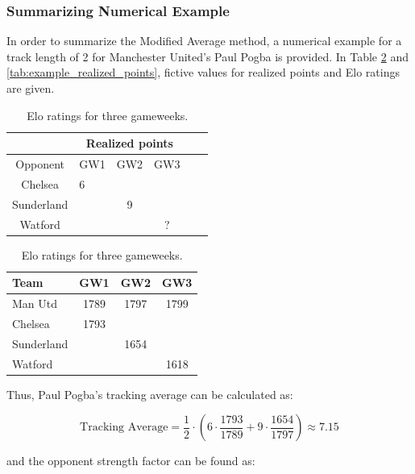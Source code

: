 \subsubsection{Summarizing Numerical Example}

In order to summarize the Modified Average method, a numerical example for a track length of 2 for Manchester United's Paul Pogba is provided. In Table \ref{tab:example_elo_ratings} and \ref{tab:example_realized_points}, fictive values for realized points and Elo ratings are given. 

\begin{table}[H]
\parbox{.45\linewidth}{
\centering
\begin{tabular}{|c|l|c|c|c|c|}
\hline
\multicolumn{1}{|c|}{} & \multicolumn{3}{c|}{Realized points} \\ \hline
Opponent            & GW1        & GW2       & GW3       \\
\hline                 
Chelsea             & 6         &           &           \\
Sunderland             &           & 9         &           \\
Watford           &           &           &  ?        \\
\hline
\end{tabular}
\caption{Realized points for Paul Pogba.}
\label{tab:example_realized_points}
}
\hfill
\parbox{.45\linewidth}{
\centering
\begin{tabular}{|l|c|c|c|}
\hline
Team        & GW1   & GW2   & GW3  \\ 
\hline
Man Utd     & 1789  & 1797  & 1799  \\
Chelsea     & 1793  &       &       \\
Sunderland  &       & 1654  &       \\
Watford     &       &       & 1618 \\ \hline
\end{tabular}
\caption{Elo ratings for three gameweeks.}
\label{tab:example_elo_ratings}
}

\end{table}

Thus, Paul Pogba's tracking average can be calculated as:

\begin{equation*}
    \textrm{Tracking Average} = \frac{1}{2} \cdot (6 \cdot \frac{1793}{1789} + 9 \cdot \frac{1654}{1797}) \approx 7.15
\end{equation*}


and the opponent strength factor can be found as:

